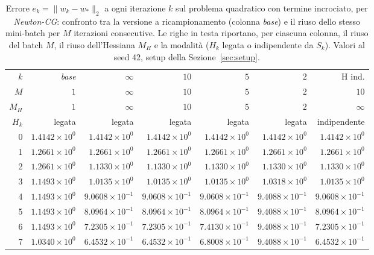 \begin{table}[H]
\centering
\footnotesize
\renewcommand{\arraystretch}{0.85}
\setlength{\tabcolsep}{2pt}
\caption{Errore $e_k=\|w_k-w_*\|_2$ a ogni iterazione $k$ sul problema quadratico con termine incrociato, per \emph{Newton-CG}: confronto tra la versione a ricampionamento (colonna \emph{base}) e il riuso dello stesso mini-batch per $M$ iterazioni consecutive. Le righe in testa riportano, per ciascuna colonna, il riuso del batch $M$, il riuso dell'Hessiana $M_H$ e la modalità ($H_k$ legata o indipendente da $S_k$). Valori al seed 42, setup della Sezione~\ref{sec:setup}.}
\label{tab:riuso_offdiag_ncg}
\begin{tabular}{@{}rrrrrrr@{}}
\toprule
$k$ & \emph{base} & $\infty$ & $10$ & $5$ & $2$ & H ind.\\
$M$ & $1$ & $\infty$ & $10$ & $5$ & $2$ & $10$\\
$M_H$ & $1$ & $\infty$ & $10$ & $5$ & $2$ & $\infty$\\
$H_k$ & legata & legata & legata & legata & legata & indipendente\\
\midrule
0 & $1.4142\times10^{0}$ & $1.4142\times10^{0}$ & $1.4142\times10^{0}$ & $1.4142\times10^{0}$ & $1.4142\times10^{0}$ & $1.4142\times10^{0}$\\
1 & $1.2661\times10^{0}$ & $1.2661\times10^{0}$ & $1.2661\times10^{0}$ & $1.2661\times10^{0}$ & $1.2661\times10^{0}$ & $1.2661\times10^{0}$\\
2 & $1.2661\times10^{0}$ & $1.1330\times10^{0}$ & $1.1330\times10^{0}$ & $1.1330\times10^{0}$ & $1.1330\times10^{0}$ & $1.1330\times10^{0}$\\
3 & $1.1493\times10^{0}$ & $1.0135\times10^{0}$ & $1.0135\times10^{0}$ & $1.0135\times10^{0}$ & $1.0318\times10^{0}$ & $1.0135\times10^{0}$\\
4 & $1.1493\times10^{0}$ & $9.0608\times10^{-1}$ & $9.0608\times10^{-1}$ & $9.0608\times10^{-1}$ & $9.4088\times10^{-1}$ & $9.0608\times10^{-1}$\\
5 & $1.1493\times10^{0}$ & $8.0964\times10^{-1}$ & $8.0964\times10^{-1}$ & $8.0964\times10^{-1}$ & $9.4088\times10^{-1}$ & $8.0964\times10^{-1}$\\
6 & $1.1493\times10^{0}$ & $7.2305\times10^{-1}$ & $7.2305\times10^{-1}$ & $7.4130\times10^{-1}$ & $9.4088\times10^{-1}$ & $7.2305\times10^{-1}$\\
7 & $1.0340\times10^{0}$ & $6.4532\times10^{-1}$ & $6.4532\times10^{-1}$ & $6.8008\times10^{-1}$ & $9.4088\times10^{-1}$ & $6.4532\times10^{-1}$\\

\end{tabular}
\end{table}
